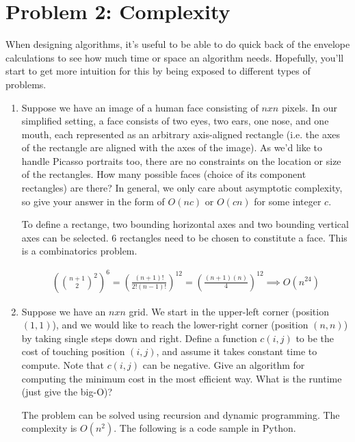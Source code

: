 \documentclass[10pt]{article}
\begin{document}
\iffalse
\section*{\normalsize Problem 2: Complexity}

When designing algorithms, it's useful to be able to do quick back of the envelope calculations to see how much time or space an algorithm needs. Hopefully, you'll start to get more intuition for this by being exposed to different types of problems.

\begin{enumerate}[label=(\alph*)]

  \item Suppose we have an image of a human face consisting of $nxn$ pixels. In our simplified setting, a face consists of two eyes, two ears, one nose, and one mouth, each represented as an arbitrary axis-aligned rectangle (i.e. the axes of the rectangle are aligned with the axes of the image). As we'd like to handle Picasso portraits too, there are no constraints on the location or size of the rectangles. How many possible faces (choice of its component rectangles) are there? In general, we only care about asymptotic complexity, so give your answer in the form of $O(nc)$ or $O(cn)$ for some integer $c$.
  
  To define a rectange, two bounding horizontal axes and two bounding vertical axes can be selected. 6 rectangles need to be chosen to constitute a face. This is a combinatorics problem.
  
  \begin{align*}
  \left(\binom{n + 1}{2}^2\right)^6 = \left(\frac{(n + 1)!}{2!(n - 1)!}\right)^{12} = \left(\frac{(n + 1)(n)}{4}\right)^{12} \implies O(n^{24})
  \end{align*}
  
  \item Suppose we have an $nxn$ grid. We start in the upper-left corner (position $(1,1)$), and we would like to reach the lower-right corner (position $(n,n)$) by taking single steps down and right. Define a function $c(i,j)$ to be the cost of touching position $(i,j)$, and assume it takes constant time to compute. Note that $c(i,j)$ can be negative. Give an algorithm for computing the minimum cost in the most efficient way. What is the runtime (just give the big-O)?
  
  The problem can be solved using recursion and dynamic programming. The complexity is $O(n^2)$. The following is a code sample in Python.
  

\end{enumerate}
\end{document}
